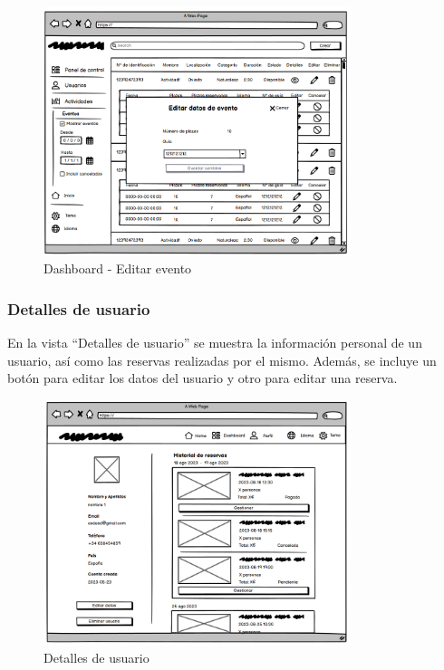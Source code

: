 \begin{figure}[H]
	\centering
	\includegraphics[width=0.8\textwidth]{5-AnalisisDelSistemaDeInformacion/InterfacesDeUsuario/Dashboard/lista eventos edit.png}
	\caption{Dashboard - Editar evento}
\end{figure}

\subsubsection*{Detalles de usuario}
En la vista “Detalles de usuario” se muestra la información personal de un usuario, así como las reservas realizadas por el mismo.
Además, se incluye un botón para editar los datos del usuario y otro para editar una reserva.

\begin{figure}[H]
	\centering
	\includegraphics[width=0.8\textwidth]{5-AnalisisDelSistemaDeInformacion/InterfacesDeUsuario/Dashboard/detalles usuario.png}
	\caption{Detalles de usuario}
\end{figure}

